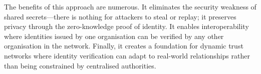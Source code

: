 The benefits of this approach are numerous. It eliminates the security weakness of shared secrets—there is nothing for attackers to steal or replay; it preserves privacy through the zero-knowledge proof of identity. It enables interoperability where identities issued by one organisation can be verified by any other organisation in the network. Finally, it creates a foundation for dynamic trust networks where identity verification can adapt to real-world relationships rather than being constrained by centralised authorities.




